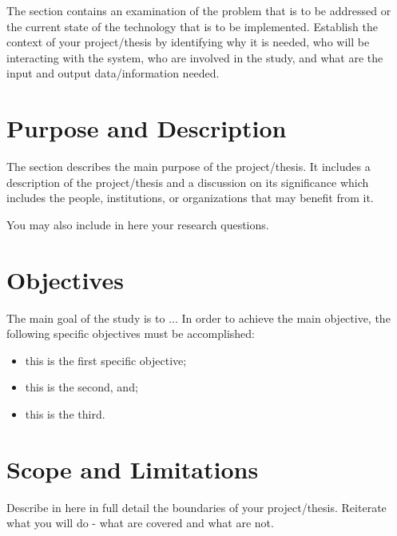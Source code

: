 The section contains an examination of the problem that is to be addressed or the current state of the technology that is to be implemented. Establish the context of your project/thesis by identifying why it is needed, who will be interacting with the system, 
who are involved in the study, and what are the input and output data/information needed.

\section{Purpose and Description}

The section describes the main purpose of the  project/thesis. It includes a description of the project/thesis and a discussion on its significance which includes the people, institutions, or organizations that may benefit from it.

You may also include in here your research questions.

\section{Objectives}

The main goal of the study is to ... In order to achieve the main objective, the following specific objectives must be accomplished:
\begin{itemize}
    \item this is the first specific objective;
    \item this is the second, and;
    \item this is the third.
\end{itemize}

\section{Scope and Limitations}

Describe in here in full detail the boundaries of your project/thesis. Reiterate what you will do - what are covered and what are not.
